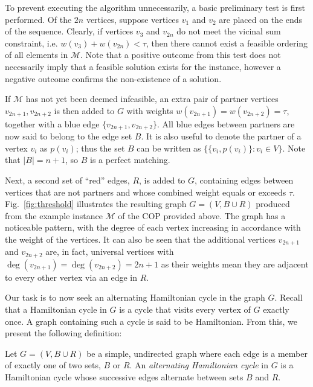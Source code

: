 \documentclass{IEEEtran}
\begin{document}
To prevent executing the algorithm unnecessarily, a basic preliminary test is first performed. Of the $2n$ vertices, suppose vertices $v_1$ and $v_2$ are placed on the ends of the sequence. Clearly, if vertices $v_3$ and $v_{2n}$ do not meet the vicinal sum constraint, i.e. $w(v_3) + w(v_{2n}) < \tau$, then there cannot exist a feasible ordering of all elements in $\mathcal{M}$. Note that a positive outcome from this test does not necessarily imply that a feasible solution exists for the instance, however a negative outcome confirms the non-existence of a solution.

If $\mathcal{M}$ has not yet been deemed infeasible, an extra pair of partner vertices $v_{2n+1}, v_{2n+2}$ is then added to $G$ with weights $w(v_{2n+1}) = w(v_{2n+2}) = \tau$, together with a blue edge $\{v_{2n+1}, v_{2n+2}\}$. All blue edges between partners are now said to belong to the edge set $B$. It is also useful to denote the partner of a vertex $v_i$ as $p(v_i)$; thus the set $B$ can be written as $\{\{v_i, p(v_i)\} : v_i \in V\}$. Note that $|B| = n+1$, so $B$ is a perfect matching. 

Next, a second set of ``red'' edges, $R$, is added to $G$, containing edges between vertices that are not partners and whose combined weight equals or exceeds $\tau$. Fig.~\ref{fig:threshold} illustrates the resulting graph $G = (V, B \cup R)$ produced from the example instance $\mathcal{M}$ of the COP provided above. The graph has a noticeable pattern, with the degree of each vertex increasing in accordance with the weight of the vertices. It can also be seen that the additional vertices $v_{2n+1}$ and $v_{2n+2}$ are, in fact, universal vertices with $\deg(v_{2n+1}) = \deg(v_{2n+2}) = 2n+1$ as their weights mean they are adjacent to every other vertex via an edge in $R$.

Our task is to now seek an alternating Hamiltonian cycle in the graph $G$. Recall that a Hamiltonian cycle in $G$ is a cycle that visits every vertex of $G$ exactly once. A graph containing such a cycle is said to be Hamiltonian. From this, we present the following definition:

\begin{definition} %
	Let $G = (V, B \cup R)$ be a simple, undirected graph where each edge is a member of exactly one of two sets, $B$ or $R$. An \emph{alternating Hamiltonian cycle} in $G$ is a Hamiltonian cycle whose successive edges alternate between sets $B$ and $R$.
	\label{defn:althamcycle}
\end{definition}
\end{document}
